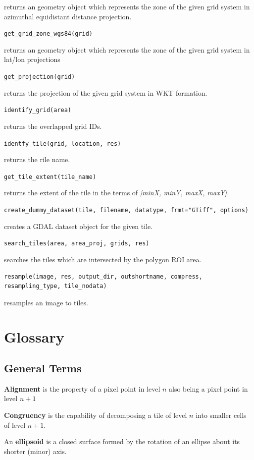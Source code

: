 \documentclass[10pt,a4paper]{article}
\begin{document}
returns an geometry object which represents the zone of the given grid system in azimuthal equidistant distance projection.

\verb#get_grid_zone_wgs84(grid)#

returns an geometry object which represents the zone of the given grid system in lat/lon projections

\verb#get_projection(grid)#

returns the projection of the given grid system in WKT formation.

\verb#identify_grid(area)#

returns the overlapped grid IDs.

\verb#identfy_tile(grid, location, res)#

returns the rile name.

\verb#get_tile_extent(tile_name)#
 
returns the extent of the tile in the terms of \textit{[minX, minY, maxX, maxY]}.

\verb#create_dummy_dataset(tile, filename, datatype, frmt="GTiff", options)#

creates a GDAL dataset object for the given tile.

\verb#search_tiles(area, area_proj, grids, res)#

searches the tiles which are intersected by the polygon ROI area.

\newpage

\begin{lstlisting}
resample(image, res, output_dir, outshortname, compress, resampling_type, tile_nodata)
\end{lstlisting}

resamples an image to tiles.


\section{Glossary}

\subsection*{General Terms}

\textbf{Alignment} is the property of a pixel point in level $n$ also being a pixel point in level $n+1$

\textbf{Congruency} is the capability of decomposing a tile of level $n$ into smaller cells of level $n+1$.

An \textbf{ellipsoid} is a closed surface formed by the rotation of an ellipse about its shorter (minor) axis. 
\end{document}
